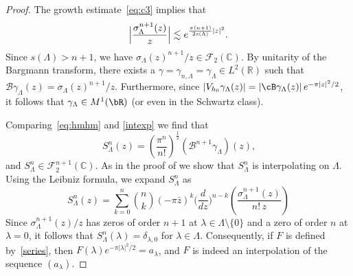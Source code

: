 \documentclass[12pt]{amsart}
\theoremstyle{plain}
\numberwithin{equation}{section}
\begin{document}
\begin{proof}
The growth estimate~\eqref{eq:c3} implies that 
\begin{equation*}
\Big|\frac{\sigma _\Lambda ^{n+1}(z)}{z} \Big| \lesssim e^{\frac{\pi (n+1)}{%
2 s(\Lambda )} \left\vert z\right\vert ^{2}}\text{.}
\end{equation*}
Since $s(\Lambda )>n+1$, we have $\sigma _{\Lambda }(z) ^{n+1}/z \in 
\mathcal{F}_{2}(%
\mathbb{C}
)$. By unitarity of the Bargmann transform, there exists a $\gamma = \gamma
_{n, \Lambda } = \gamma _\Lambda \in L^{2}\left( 
\mathbb{R}
\right) $ such that $\mathcal{B} \gamma _{\Lambda }(z) = \sigma _{\Lambda
}(z) ^{n+1}/z$. Furthermore, since $|V_{h_0} \gamma _\Lambda (z)| = |\cB %
\gamma _\Lambda (z)| \, e^{-\pi |z|^2/2}$, it follows that $\gamma _\Lambda
\in M^1(\bR )$ (or even in the Schwartz class).

Comparing~\eqref{eq:hmhm} and \eqref{intexp} we find that 
\begin{equation*}
S_{\Lambda }^{n}(z)=\left( \frac{\pi ^{n}}{n!}\right) ^{\frac{1}{2}}(%
\mathcal{B}^{n+1}\gamma _{\Lambda })(z)\text{,}
\end{equation*}%
and $S_{\Lambda }^{n}\in \mathcal{F}_{2}^{n+1}(%
\mathbb{C}
)$. As in the proof of \cite[Thm.~1.1]{CharlyYurasuper} we show that $%
S_{\Lambda }^{n}$ is interpolating on $\Lambda $. Using the Leibniz formula,
we expand $S_{\Lambda }^{n}$ as 
\begin{equation*}
S_{\Lambda }^{n}(z)=\sum_{k=0}^{n}\binom{n}{k}(-\pi \bar{z})^{k}\Big(\frac{d%
}{dz}\Big)^{n-k}\left( \frac{\sigma _{\Lambda }^{n+1}(z)}{n!\,z}\right) 
\end{equation*}%
Since $\sigma _{\Lambda }^{n+1}(z)/z$ has zeros of order $n+1$ at $\lambda
\in \Lambda \setminus \{0\}$ and a zero of order $n$ at $\lambda =0$, it
follows that $S_{\Lambda }^{n}(\lambda )=\delta _{\lambda ,0}$ for $\lambda
\in \Lambda $. Consequently, if $F$ is defined by~\eqref{series}, then $%
F(\lambda )e^{-\pi |\lambda |^{2}/2}=a_{\lambda }$, and $F$ is indeed an
interpolation of the sequence $(a_{\lambda })$.


\end{proof}
\end{document}
